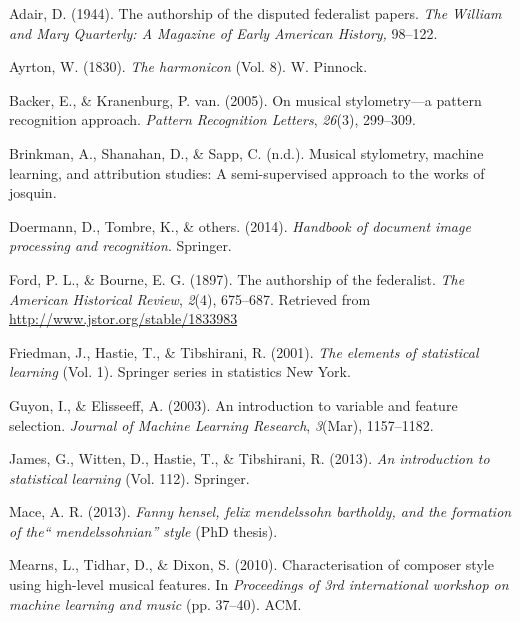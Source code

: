 \documentclass[12pt,twoside]{reedthesis}
\theoremstyle{definition}
\theoremstyle{definition}
\theoremstyle{definition}
\theoremstyle{remark}
\begin{document}

\noindent

\setlength{\parindent}{-0.20in} \setlength{\leftskip}{0.20in}
\setlength{\parskip}{8pt}

\hypertarget{refs}{}
\hypertarget{ref-adair1944}{}
Adair, D. (1944). The authorship of the disputed federalist papers.
\emph{The William and Mary Quarterly: A Magazine of Early American
History,} 98--122.

\hypertarget{ref-harmonicon}{}
Ayrton, W. (1830). \emph{The harmonicon} (Vol. 8). W. Pinnock.

\hypertarget{ref-backer2005}{}
Backer, E., \& Kranenburg, P. van. (2005). On musical stylometry---a
pattern recognition approach. \emph{Pattern Recognition Letters},
\emph{26}(3), 299--309.

\hypertarget{ref-brinkman2016}{}
Brinkman, A., Shanahan, D., \& Sapp, C. (n.d.). Musical stylometry,
machine learning, and attribution studies: A semi-supervised approach to
the works of josquin.

\hypertarget{ref-OMR}{}
Doermann, D., Tombre, K., \& others. (2014). \emph{Handbook of document
image processing and recognition}. Springer.

\hypertarget{ref-authorshipfed}{}
Ford, P. L., \& Bourne, E. G. (1897). The authorship of the federalist.
\emph{The American Historical Review}, \emph{2}(4), 675--687. Retrieved
from \url{http://www.jstor.org/stable/1833983}

\hypertarget{ref-esl}{}
Friedman, J., Hastie, T., \& Tibshirani, R. (2001). \emph{The elements
of statistical learning} (Vol. 1). Springer series in statistics New
York.

\hypertarget{ref-guyon2003}{}
Guyon, I., \& Elisseeff, A. (2003). An introduction to variable and
feature selection. \emph{Journal of Machine Learning Research},
\emph{3}(Mar), 1157--1182.

\hypertarget{ref-isl}{}
James, G., Witten, D., Hastie, T., \& Tibshirani, R. (2013). \emph{An
introduction to statistical learning} (Vol. 112). Springer.

\hypertarget{ref-mace2013}{}
Mace, A. R. (2013). \emph{Fanny hensel, felix mendelssohn bartholdy, and
the formation of the`` mendelssohnian'' style} (PhD thesis).

\hypertarget{ref-mearns2010}{}
Mearns, L., Tidhar, D., \& Dixon, S. (2010). Characterisation of
composer style using high-level musical features. In \emph{Proceedings
of 3rd international workshop on machine learning and music} (pp.
37--40). ACM.
\end{document}
